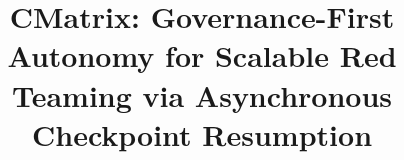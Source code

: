 \documentclass[conference]{IEEEtran}
\begin{document}
\title{CMatrix: Governance-First Autonomy for Scalable Red Teaming via Asynchronous Checkpoint Resumption}

\author{
}

\maketitle










\end{document}
